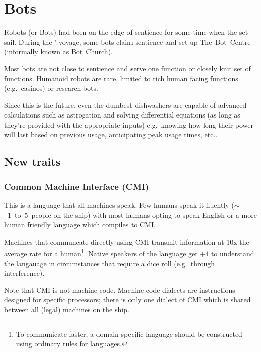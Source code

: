 \documentclass[a4paper,twocolumn]{memoir}
\begin{document}
\section{Bots}
\label{sec:bots}

Robots (or Bots) had been on the edge of sentience for some time when the
\aventis set sail. During the \aventis' voyage, some bots claim sentience and
set up The~Bot~Centre (informally known as Bot~Church). 

Most bots are not close to sentience and serve one function or closely knit set of functions. Humanoid robots are rare, limited to rich human facing functions (e.g.~casinos) or research bots. 


Since this is the future, even the dumbest dishwashers are capable of advanced
calculations such as astrogation and solving differential equations (as long as
they're provided with the appropriate inputs) e.g.~knowing how long their power
will last based on previous usage, anticipating peak usage times, etc..

\subsection{New traits}
\label{sec:new-traits}

\subsubsection{Common Machine Interface (CMI)}
\label{sec:comm-mach-interf}

This is a language that all machines speak. Few humans speak it fluently
(\(\sim\)~1~to~5~people on the ship) with most humans opting to speak English or
a more human friendly language which compiles to CMI.

Machines that communcate directly using CMI transmit information at 10x the
average rate for a human\footnote{To communicate faster, a domain specific
  language should be constructed using ordinary \gurps rules for languages.
  }.
Native speakers of the language get +4 to understand the langauage in
circumstances that require a dice roll (e.g.~through interference).

Note that CMI is not machine code. Machine code dialects are instructions
designed for specific processors; there is only one dialect of CMI which is
shared between all (legal) machines on the ship.
\end{document}
